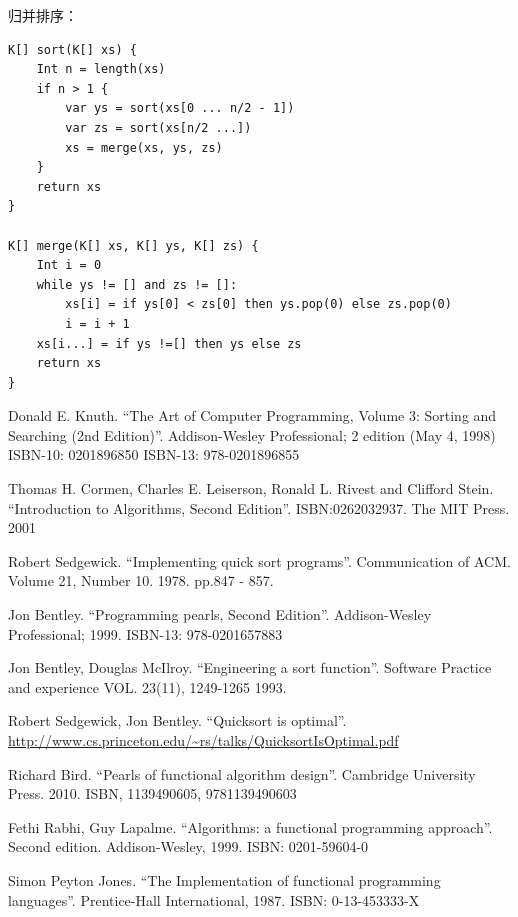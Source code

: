 \documentclass[b5paper]{ctexart}
\begin{document}
归并排序：

\begin{lstlisting}[language = Bourbaki]
K[] sort(K[] xs) {
    Int n = length(xs)
    if n > 1 {
        var ys = sort(xs[0 ... n/2 - 1])
        var zs = sort(xs[n/2 ...])
        xs = merge(xs, ys, zs)
    }
    return xs
}

K[] merge(K[] xs, K[] ys, K[] zs) {
    Int i = 0
    while ys != [] and zs != []:
        xs[i] = if ys[0] < zs[0] then ys.pop(0) else zs.pop(0)
        i = i + 1
    xs[i...] = if ys !=[] then ys else zs
    return xs
}
\end{lstlisting}

\ifx\wholebook\relax\else

\begin{thebibliography}{99}

Donald E. Knuth. ``The Art of Computer Programming, Volume 3: Sorting and Searching (2nd Edition)''. Addison-Wesley Professional; 2 edition (May 4, 1998) ISBN-10: 0201896850 ISBN-13: 978-0201896855

Thomas H. Cormen, Charles E. Leiserson, Ronald L. Rivest and Clifford Stein.
``Introduction to Algorithms, Second Edition''. ISBN:0262032937. The MIT Press. 2001

Robert Sedgewick. ``Implementing quick sort programs''. Communication of ACM. Volume 21, Number 10. 1978. pp.847 - 857.

Jon Bentley. ``Programming pearls, Second Edition''. Addison-Wesley Professional; 1999. ISBN-13: 978-0201657883

Jon Bentley, Douglas McIlroy. ``Engineering a sort function''. Software Practice and experience VOL. 23(11), 1249-1265 1993.

Robert Sedgewick, Jon Bentley. ``Quicksort is optimal''. \url{http://www.cs.princeton.edu/~rs/talks/QuicksortIsOptimal.pdf}

Richard Bird. ``Pearls of functional algorithm design''. Cambridge University Press. 2010. ISBN, 1139490605, 9781139490603

Fethi Rabhi, Guy Lapalme. ``Algorithms: a functional programming approach''. Second edition. Addison-Wesley, 1999. ISBN: 0201-59604-0

Simon Peyton Jones. ``The Implementation of functional programming languages''. Prentice-Hall International, 1987. ISBN: 0-13-453333-X


\end{thebibliography}
\end{document}
